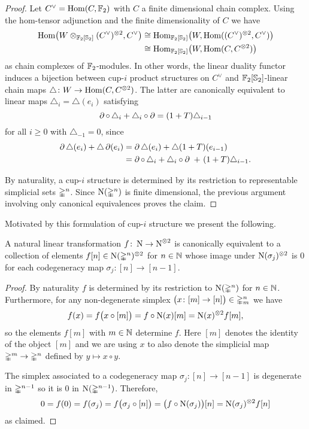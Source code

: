 \begin{proof}
	Let $C^\vee = \mathrm{Hom}(C, {\mathbb{F}_2})$ with $C$ a finite dimensional chain complex.
	Using the hom-tensor adjunction and the finite dimensionality of $C$ we have
	\begin{align*}
	\mathrm{Hom} \big(W \otimes_{{\mathbb{F}_2}[\mathbb{S}_2]} (C^\vee)^{\otimes 2}, C^\vee \big) & \cong
	\mathrm{Hom}_{{\mathbb{F}_2}[\mathbb{S}_2]} \big( W, \mathrm{Hom}((C^\vee)^{\otimes 2}, C^\vee) \big) \\ & \cong
	\mathrm{Hom}_{{\mathbb{F}_2}[\mathbb{S}_2]} \big( W, \mathrm{Hom}(C, C^{\otimes 2}) \big)
	\end{align*}
	as chain complexes of ${\mathbb{F}_2}$-modules.
	In other words, the linear duality functor induces a bijection between \mbox{cup-$i$} product structures on $C^\vee$ and ${\mathbb{F}_2}[\mathbb{S}_2]$-linear chain maps $\triangle \colon W \to \mathrm{Hom}(C, C^{\otimes 2})$.
	The latter are canonically equivalent to linear maps $\triangle_i = \triangle(e_i)$ satisfying
	\[
	\operatorname{\partial} \circ \, \triangle_i + \triangle_i \circ \operatorname{\partial} =
	(1+T) \triangle_{i-1}
	\]
	for all $i \geq 0$ with $\triangle_{-1} = 0$, since
	\begin{align*}
	\operatorname{\partial} \triangle (e_i) + \triangle \operatorname{\partial}(e_i) &=
	\operatorname{\partial} \triangle (e_i) + \triangle (1+T) (e_{i-1}) \\ &=
	\operatorname{\partial} \circ \, \triangle_i + \triangle_i \circ \operatorname{\partial} \ +\ (1+T) \triangle_{i-1}.
	\end{align*}

	By naturality, a \mbox{cup-$i$} structure is determined by its restriction to representable simplicial sets $\mathbb{\Delta}^n$.
	Since $\operatorname{N}(\mathbb{\Delta}^n)$ is finite dimensional, the previous argument involving only canonical equivalences proves the claim.
\end{proof}

Motivated by this formulation of \mbox{cup-$i$} structure we present the following.

\begin{lemma} \label{l:natural}
	A natural linear transformation $f \colon \operatorname{N} \to \operatorname{N}^{\otimes 2}$ is canonically equivalent to a collection of elements $f[n] \in \operatorname{N}(\mathbb{\Delta}^n)^{\otimes 2}$	for $n \in \mathbb{N}$ whose image under $\operatorname{N}(\sigma_j)^{\otimes 2}$ is $0$
	for each codegeneracy map $\sigma_j \colon [n] \to [n-1]$.
\end{lemma}

\begin{proof}
	By naturality $f$ is determined by its restriction to $\operatorname{N}(\mathbb{\Delta}^n)$ for $n \in \mathbb{N}$.
	Furthermore, for any non-degenerate simplex $\big( x \colon [m] \to [n] \big) \in \mathbb{\Delta}^n_m$ we have
	\[
	f(x) = f \big( x \circ [m] \big) =
	f \circ \operatorname{N}(x) [m] =
	\operatorname{N}(x)^{\otimes 2} f[m],
	\]
	so the elements $f[m]$ with $m \in \mathbb{N}$ determine $f$.
	Here $[m]$ denotes the identity of the object $[m]$ and we are using $x$ to also denote the simplicial map $\mathbb{\Delta}^m \to \mathbb{\Delta}^n$ defined by $y \mapsto x \circ y$.

	The simplex associated to a codegeneracy map $\sigma_j \colon [n] \to [n-1]$ is degenerate in $\mathbb{\Delta}^{n-1}$ so it is $0$ in $\operatorname{N}(\mathbb{\Delta}^{n-1})$.
	Therefore,
	\[
	0 = f(0) = f(\sigma_j) =
	f \big( \sigma_j \circ [n] \big) =
	\big( f \circ \operatorname{N}(\sigma_j) \big) [n] =
	\operatorname{N}(\sigma_j)^{\otimes 2} f[n]
	\]
	as claimed.
\end{proof}

